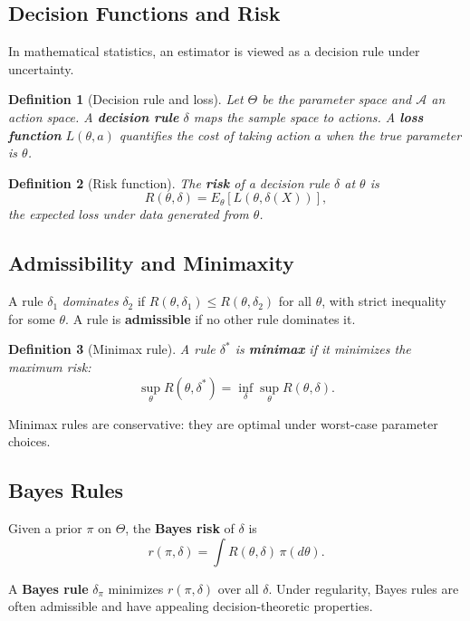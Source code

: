 \documentclass[11pt,a4paper]{article}
\newtheorem{definition}{Definition}[section]
\numberwithin{equation}{section}
\begin{document}
\subsection{Decision Functions and Risk}

In mathematical statistics, an estimator is viewed as a decision rule under uncertainty.

\begin{definition}[Decision rule and loss]
Let $\Theta$ be the parameter space and $\mathcal{A}$ an action space. 
A \textbf{decision rule} $\delta$ maps the sample space to actions.
A \textbf{loss function} $L(\theta,a)$ quantifies the cost of taking action $a$ when the true parameter is $\theta$.
\end{definition}

\begin{definition}[Risk function]
The \textbf{risk} of a decision rule $\delta$ at $\theta$ is
\[
R(\theta,\delta) = E_\theta[L(\theta,\delta(X))],
\]
the expected loss under data generated from $\theta$.
\end{definition}

\subsection{Admissibility and Minimaxity}

A rule $\delta_1$ \emph{dominates} $\delta_2$ if $R(\theta,\delta_1) \le R(\theta,\delta_2)$ for all $\theta$, with strict inequality for some $\theta$. 
A rule is \textbf{admissible} if no other rule dominates it.

\begin{definition}[Minimax rule]
A rule $\delta^*$ is \textbf{minimax} if it minimizes the maximum risk:
\[
\sup_{\theta} R(\theta,\delta^*)
= \inf_{\delta} \sup_\theta R(\theta,\delta).
\]
\end{definition}

Minimax rules are conservative: they are optimal under worst-case parameter choices.

\subsection{Bayes Rules}

Given a prior $\pi$ on $\Theta$, the \textbf{Bayes risk} of $\delta$ is
\[
r(\pi,\delta)
= \int R(\theta,\delta)\,\pi(d\theta).
\]

A \textbf{Bayes rule} $\delta_\pi$ minimizes $r(\pi,\delta)$ over all $\delta$. 
Under regularity, Bayes rules are often admissible and have appealing decision-theoretic properties.
\end{document}
